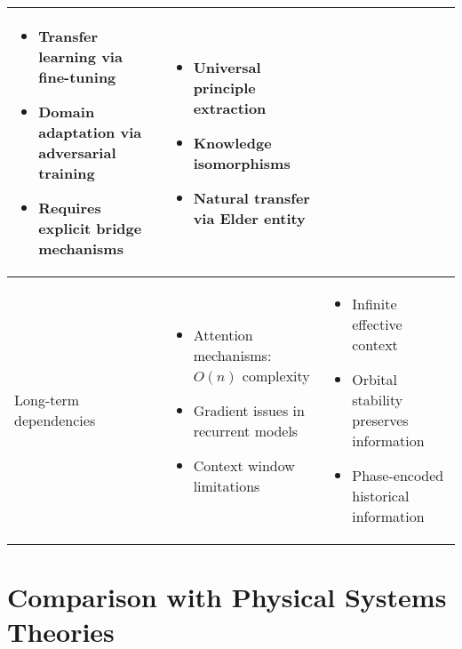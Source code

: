 \begin{center}
\begin{tabular}{|p{3cm}|p{5cm}|p{5cm}|}
\begin{itemize}
    \item Transfer learning via fine-tuning
    \item Domain adaptation via adversarial training
    \item Requires explicit bridge mechanisms
\end{itemize} &
\begin{itemize}
    \item Universal principle extraction
    \item Knowledge isomorphisms
    \item Natural transfer via Elder entity
\end{itemize} \\
\hline
Long-term dependencies & 
\begin{itemize}
    \item Attention mechanisms: $O(n)$ complexity
    \item Gradient issues in recurrent models
    \item Context window limitations
\end{itemize} &
\begin{itemize}
    \item Infinite effective context
    \item Orbital stability preserves information
    \item Phase-encoded historical information
\end{itemize} \\
\hline
\end{tabular}
\label{tab:ml_comparison}
\end{center}

\section{Comparison with Physical Systems Theories}

